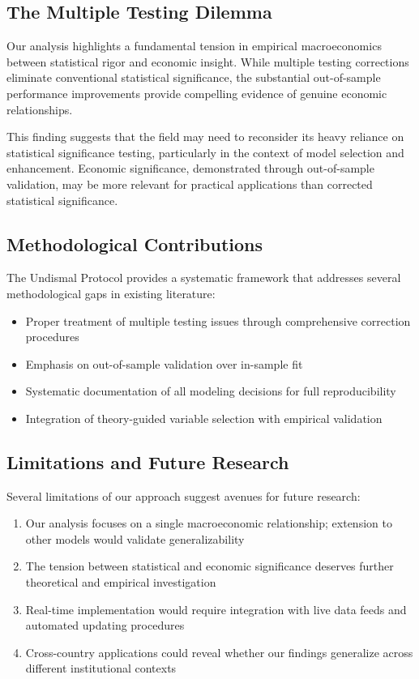 \documentclass[12pt]{article}
\begin{document}
\subsection{The Multiple Testing Dilemma}

Our analysis highlights a fundamental tension in empirical macroeconomics between statistical rigor and economic insight. While multiple testing corrections eliminate conventional statistical significance, the substantial out-of-sample performance improvements provide compelling evidence of genuine economic relationships.

This finding suggests that the field may need to reconsider its heavy reliance on statistical significance testing, particularly in the context of model selection and enhancement. Economic significance, demonstrated through out-of-sample validation, may be more relevant for practical applications than corrected statistical significance.

\subsection{Methodological Contributions}

The Undismal Protocol provides a systematic framework that addresses several methodological gaps in existing literature:

\begin{itemize}
\item Proper treatment of multiple testing issues through comprehensive correction procedures
\item Emphasis on out-of-sample validation over in-sample fit
\item Systematic documentation of all modeling decisions for full reproducibility
\item Integration of theory-guided variable selection with empirical validation
\end{itemize}

\subsection{Limitations and Future Research}

Several limitations of our approach suggest avenues for future research:

\begin{enumerate}
\item Our analysis focuses on a single macroeconomic relationship; extension to other models would validate generalizability
\item The tension between statistical and economic significance deserves further theoretical and empirical investigation
\item Real-time implementation would require integration with live data feeds and automated updating procedures
\item Cross-country applications could reveal whether our findings generalize across different institutional contexts
\end{enumerate}
\end{document}
